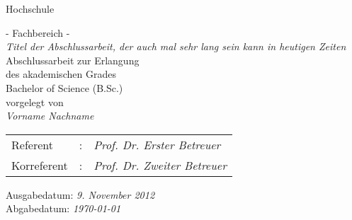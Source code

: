 \documentclass{article}
\begin{document}
\begin{titlepage}
\begin{center}

%

	\vspace*{3cm} %

	\vspace{0.8cm}
	{ \LARGE Hochschule }\\ 

	{
		\Large - Fachbereich - \\ 

		\vspace{1.8cm} 
		{\it \glqq{}Titel der Abschlussarbeit, der auch mal sehr lang sein kann in heutigen Zeiten \grqq{} } \\
		
		\vspace{0.8cm}
		Abschlussarbeit zur Erlangung \\
		des akademischen Grades \\
		Bachelor of Science (B.Sc.) \\ 

		\vspace{0.8cm}
		vorgelegt von\\ 
		{\it Vorname Nachname}

		\vspace{1.8cm}
		\begin{tabular}{lll} 
			Referent &:& {\it Prof. Dr. Erster Betreuer}\\
			Korreferent &:& {\it Prof. Dr. Zweiter Betreuer} 
		\end{tabular}

		\vspace{0.8cm}
		Ausgabedatum: {\it 9. November 2012} \\
		\vspace{0.25cm}
		Abgabedatum: {\it \today}
	}

\end{center}
\end{titlepage}
\end{document}
